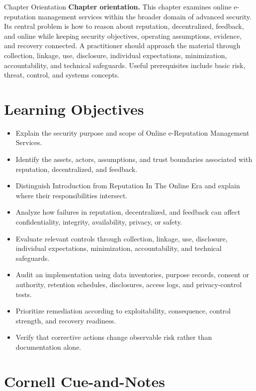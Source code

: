\documentclass[11pt,letterpaper]{article}
\title{\CornellDocumentTitle}
\author{}
\date{}
\begin{document}
\maketitle
\begin{CornellOverviewBox}{Chapter Orientation}
\textbf{Chapter orientation.} This chapter examines online e-reputation management services within the broader domain of advanced security. Its central problem is how to reason about reputation, decentralized, feedback, and online while keeping security objectives, operating assumptions, evidence, and recovery connected. A practitioner should approach the material through collection, linkage, use, disclosure, individual expectations, minimization, accountability, and technical safeguards. Useful prerequisites include basic risk, threat, control, and systems concepts.
\end{CornellOverviewBox}
\section*{Learning Objectives}
\begin{itemize}
\item Explain the security purpose and scope of Online e-Reputation Management Services.
\item Identify the assets, actors, assumptions, and trust boundaries associated with reputation, decentralized, and feedback.
\item Distinguish Introduction from Reputation In The Online Era and explain where their responsibilities intersect.
\item Analyze how failures in reputation, decentralized, and feedback can affect confidentiality, integrity, availability, privacy, or safety.
\item Evaluate relevant controls through collection, linkage, use, disclosure, individual expectations, minimization, accountability, and technical safeguards.
\item Audit an implementation using data inventories, purpose records, consent or authority, retention schedules, disclosures, access logs, and privacy-control tests.
\item Prioritize remediation according to exploitability, consequence, control strength, and recovery readiness.
\item Verify that corrective actions change observable risk rather than documentation alone.
\end{itemize}
\section*{Cornell Cue-and-Notes}
\end{document}

